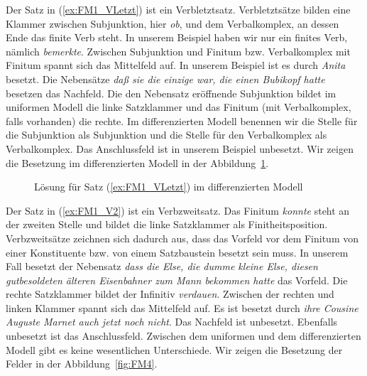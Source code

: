 Der Satz in (\ref{ex:FM1_VLetzt}) ist ein Verbletztsatz. Verbletztsätze bilden eine Klammer zwischen Subjunktion, hier \textit{ob}, und dem Verbalkomplex, an dessen Ende das finite Verb steht. In unserem Beispiel haben wir nur ein finites Verb, nämlich \textit{bemerkte}. Zwischen Subjunktion und Finitum bzw. Verbalkomplex mit Finitum spannt sich das Mittelfeld auf. In unserem Beispiel ist es durch \textit{Anita} besetzt. Die Nebensätze \textit{daß sie die einzige war, die einen Bubikopf hatte} besetzen das Nachfeld. Die den Nebensatz eröffnende Subjunktion bildet im uniformen Modell die linke Satzklammer und das Finitum (mit Verbalkomplex, falls vorhanden) die rechte. Im differenzierten Modell benennen wir die Stelle für die Subjunktion als Subjunktion und die Stelle für den Verbalkomplex als Verbalkomplex. Das Anschlussfeld ist in unserem Beispiel unbesetzt. Wir zeigen die Besetzung im differenzierten Modell in der Abbildung~\ref{fig:FM2}.

\begin{figure}[!htbp]
  \centering
  \caption{Lösung für Satz (\ref{ex:FM1_VLetzt}) im differenzierten Modell}
  \label{fig:FM2}
\end{figure}
 
 \largerpage
Der Satz in (\ref{ex:FM1_V2}) ist ein Verbzweitsatz. Das Finitum \textit{konnte} steht an der zweiten Stelle und bildet die linke Satzklammer als Finitheitsposition. Verbzweitsätze zeichnen sich dadurch aus, dass das Vorfeld vor dem Finitum von einer Konstituente bzw. von einem Satzbaustein besetzt sein muss. In unserem Fall besetzt der Nebensatz \textit{dass die Else, die dumme kleine Else, diesen gutbesoldeten älteren Eisenbahner zum Mann bekommen hatte} das Vorfeld. Die rechte Satzklammer bildet der Infinitiv \textit{verdauen}. Zwischen der rechten und linken Klammer spannt sich das Mittelfeld auf. Es ist besetzt durch \textit{ihre Cousine Auguste Marnet auch jetzt noch nicht}. Das Nachfeld ist unbesetzt. Ebenfalls unbesetzt ist das Anschlussfeld. Zwischen dem uniformen und dem differenzierten Modell gibt es keine wesentlichen Unterschiede. Wir zeigen die Besetzung der Felder in der Abbildung~\ref{fig:FM4}.

